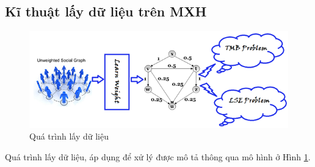 	\subsection{Kĩ thuật lấy dữ liệu trên MXH}
	\begin{center}
		\begin{figure}[htp]
			\begin{center}
				\includegraphics [scale=.5]{picture/Hinh3_1}
			\end{center}
			\caption{Quá trình lấy dữ liệu}
			\label{refhinh3_1}
		\end{figure}
	\end{center}
	Quá trình lấy dữ liệu, áp dụng để xử lý được mô tả thông qua mô hình ở Hình \ref {refhinh3_1}.
